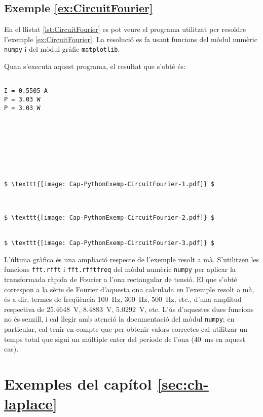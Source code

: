 \hypertarget{exemple:CircuitFourier}{\subsection{Exemple \ref*{ex:CircuitFourier} \CircuitFourier}}
En el llistat \vref{lst:CircuitFourier} es pot veure el programa utilitzat per resoldre l'exemple \vref{ex:CircuitFourier}. La resolució es fa usant funcions del mòdul numèric \texttt{numpy} i del mòdul gràfic  \texttt{matplotlib}.


Quan s'executa aquest programa, el resultat que s'obté és:
\lstset{
	language=,
	numbers=none,
	frame=none
}
\begin{lstlisting}[mathescape=true]
	
I = 0.5505 A
P = 3.03 W
P = 3.03 W








$ \texttt{[image: Cap-PythonExemp-CircuitFourier-1.pdf]} $



$ \texttt{[image: Cap-PythonExemp-CircuitFourier-2.pdf]} $


$ \texttt{[image: Cap-PythonExemp-CircuitFourier-3.pdf]} $
\end{lstlisting} 

L'última gràfica és una ampliació respecte de l'exemple resolt a mà. S'utilitzen les funcions \texttt{fft.rfft} i \texttt{fft.rfftfreq} del mòdul numèric \texttt{numpy} per aplicar la transformada ràpida de Fourier a l'ona rectangular de tensió. El que s'obté correspon a la sèrie de Fourier d'aquesta ona calculada en l'exemple resolt a  mà, és a dir, termes de freqüència \qty{100}{Hz}, \qty{300}{Hz}, \qty{500}{Hz}, etc., d'una amplitud respectiva de \qty{25,4648}{V}, \qty{8,4883}{V}, \qty{5,0292}{V}, etc. L'ús d'aquestes dues funcions no és senzill, i cal llegir amb atenció la documentació del mòdul \texttt{numpy}; en particular, cal tenir en compte que per obtenir valors correctes cal utilitzar un temps total que sigui un múltiple enter del període de l'ona (\qty{40}{ms} en aquest cas).


\section{Exemples del capítol \ref*{sec:ch-laplace}}

